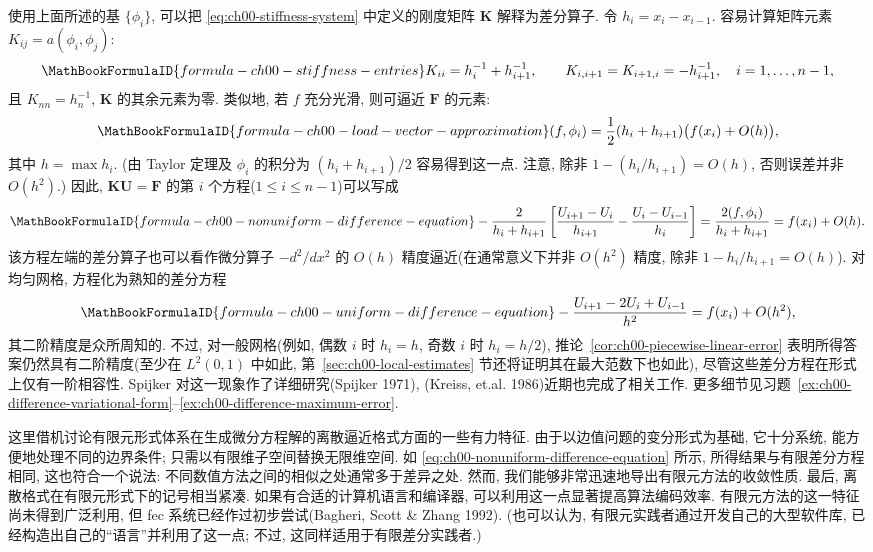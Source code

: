 使用上面所述的基 $\{\phi_i\}$, 可以把 \eqref{eq:ch00-stiffness-system} 中定义的刚度矩阵 $\mathbf K$ 解释为差分算子. 令 $h_i=x_i-x_{i-1}$. 容易计算矩阵元素 $K_{ij}=a(\phi_i,\phi_j)$:
\setcounter{equation}{0}
\begin{equation}
\MathBookFormulaID{formula-ch00-stiffness-entries}
K_{ii}=h_i^{-1}+h_{i+1}^{-1},
\qquad K_{i,i+1}=K_{i+1,i}=-h_{i+1}^{-1},
\quad i=1,\ldots,n-1,
\label{eq:ch00-stiffness-entries}
\end{equation}
且 $K_{nn}=h_n^{-1}$, $\mathbf K$ 的其余元素为零. 类似地, 若 $f$ 充分光滑, 则可逼近 $\mathbf F$ 的元素:
\begin{equation}
\MathBookFormulaID{formula-ch00-load-vector-approximation}
(f,\phi_i)=\frac12(h_i+h_{i+1})\bigl(f(x_i)+O(h)\bigr),
\label{eq:ch00-load-vector-approximation}
\end{equation}
其中 $h=\max h_i$. (由 Taylor 定理及 $\phi_i$ 的积分为 $(h_i+h_{i+1})/2$ 容易得到这一点. 注意, 除非 $1-(h_i/h_{i+1})=O(h)$, 否则误差并非 $O(h^2)$.) 因此, $\mathbf K\mathbf U=\mathbf F$ 的第 $i$ 个方程($1\leq i\leq n-1$)可以写成
\begin{equation}
\MathBookFormulaID{formula-ch00-nonuniform-difference-equation}
-\frac{2}{h_i+h_{i+1}}
\left[
\frac{U_{i+1}-U_i}{h_{i+1}}-
\frac{U_i-U_{i-1}}{h_i}
\right]
=\frac{2(f,\phi_i)}{h_i+h_{i+1}}
=f(x_i)+O(h).
\label{eq:ch00-nonuniform-difference-equation}
\end{equation}
该方程左端的差分算子也可以看作微分算子 $-d^2/dx^2$ 的 $O(h)$ 精度逼近(在通常意义下并非 $O(h^2)$ 精度, 除非 $1-h_i/h_{i+1}=O(h)$). 对均匀网格, 方程化为熟知的差分方程
\begin{equation}
\MathBookFormulaID{formula-ch00-uniform-difference-equation}
-\frac{U_{i+1}-2U_i+U_{i-1}}{h^2}=f(x_i)+O(h^2),
\label{eq:ch00-uniform-difference-equation}
\end{equation}
其二阶精度是众所周知的. 不过, 对一般网格(例如, 偶数 $i$ 时 $h_i=h$, 奇数 $i$ 时 $h_i=h/2$), 推论~\ref{cor:ch00-piecewise-linear-error} 表明所得答案仍然具有二阶精度(至少在 $L^2(0,1)$ 中如此, 第~\ref{sec:ch00-local-estimates} 节还将证明其在最大范数下也如此), 尽管这些差分方程在形式上仅有一阶相容性. Spijker 对这一现象作了详细研究(Spijker 1971), (Kreiss, et.al. 1986)近期也完成了相关工作. 更多细节见习题~\ref{ex:ch00-difference-variational-form}--\ref{ex:ch00-difference-maximum-error}.

这里借机讨论有限元形式体系在生成微分方程解的离散逼近格式方面的一些有力特征. 由于以边值问题的变分形式为基础, 它十分系统, 能方便地处理不同的边界条件; 只需以有限维子空间替换无限维空间. 如 \eqref{eq:ch00-nonuniform-difference-equation} 所示, 所得结果与有限差分方程相同, 这也符合一个说法: 不同数值方法之间的相似之处通常多于差异之处. 然而, 我们能够非常迅速地导出有限元方法的收敛性质. 最后, 离散格式在有限元形式下的记号相当紧凑. 如果有合适的计算机语言和编译器, 可以利用这一点显著提高算法编码效率. 有限元方法的这一特征尚未得到广泛利用, 但 fec 系统已经作过初步尝试(Bagheri, Scott \& Zhang 1992). (也可以认为, 有限元实践者通过开发自己的大型软件库, 已经构造出自己的``语言''并利用了这一点; 不过, 这同样适用于有限差分实践者.)

